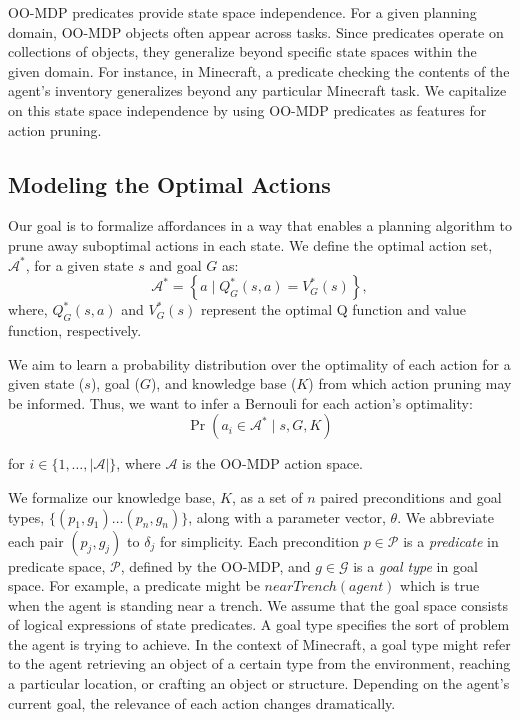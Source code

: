 \documentclass[letterpaper]{article}
\begin{document}
OO-MDP predicates provide state space independence. For a given planning domain, OO-MDP objects
often appear across tasks. Since predicates operate on collections
of objects, they generalize beyond specific state spaces within the given domain.
For instance, in Minecraft, a predicate checking the contents of the agent's inventory
generalizes beyond any particular Minecraft task. We capitalize on this state space
independence by using OO-MDP predicates as features for action pruning.

\subsection{Modeling the Optimal Actions}


Our goal is to formalize affordances in a way that enables a planning
algorithm to prune away suboptimal actions in each state. We define
the optimal action set, $\mathcal{A}^*$, for a given state $s$ and
goal $G$ as:
\begin{equation}
\mathcal{A}^* = \left\{ a \mid Q^*_G(s,a) = V^*_G(s) \right\}, 
\label{eq:opt_act_set}
\end{equation}
where, $Q^*_G(s,a)$ and $V^*_G(s)$ represent the optimal Q function and 
value function, respectively.

We aim to learn a probability distribution over the optimality of each action
for a given state ($s$), goal ($G$), and knowledge base ($K$) from
which action pruning may be informed. Thus, we want to infer a Bernouli
for each action's optimality:
\begin{equation}
\Pr(a_i \in \mathcal{A}^* \mid s, G, K)
\label{eq:master}
\end{equation}

\noindent for $i \in \{1, \ldots, |\mathcal{A}|\}$, where $\mathcal{A}$ is the OO-MDP action space.

We formalize our knowledge base, $K$, as a set of $n$ paired
preconditions and goal types, $\{ (p_1, g_1) \ldots (p_{n}, g_{n})\}$,
along with a parameter vector, $\theta$. We abbreviate each pair
$(p_j, g_j)$ to $\delta_j$ for simplicity. Each precondition $p \in
\mathcal{P}$ is a {\it predicate} in predicate space, $\mathcal{P}$,
defined by the OO-MDP, and $g \in \mathcal{G}$ is a {\it goal type} in
goal space.  For example, a predicate might be $nearTrench(agent)$
which is true when the agent is standing near a trench. We assume
that the goal space consists of logical expressions of state
predicates. A goal type specifies the sort of problem the agent is
trying to achieve. In the context of Minecraft, a goal type might
refer to the agent retrieving an object of a certain type from the
environment, reaching a particular location, or crafting an object or structure.
Depending on the agent's current goal, the relevance of each action changes
dramatically.
\end{document}
